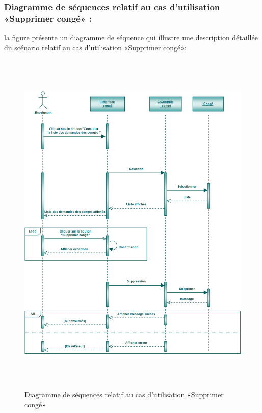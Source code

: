 \documentclass[12 pt]{report}
\begin{document}
\subsubsection{Diagramme de séquences relatif au cas d’utilisation «Supprimer  congé» :}
la figure   présente un diagramme de séquence qui illustre une description détaillée du scénario relatif au cas d’utilisation «Supprimer congé»: 
\begin{figure}[h]
 \begin{center}
\includegraphics[width= 18 cm ,height=  17cm]{ssc.PNG}
\caption{Diagramme de séquences relatif au cas d’utilisation «Supprimer congé»}

\end{center}
\end{figure}
\end{document}
